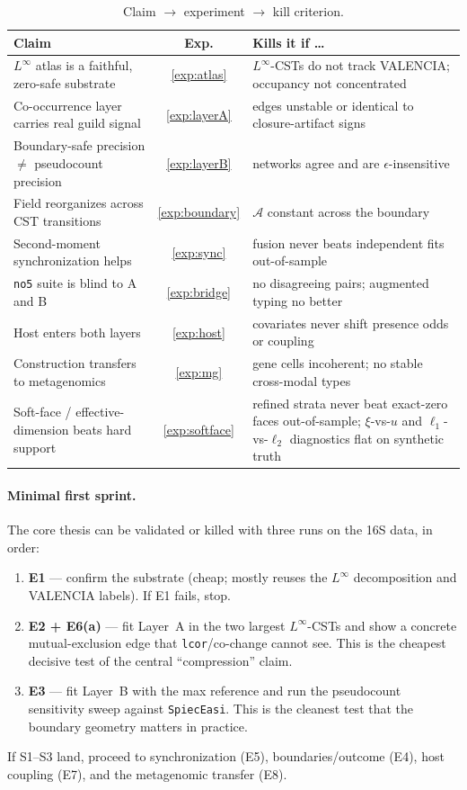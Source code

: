 \documentclass[11pt]{article}
\theoremstyle{definition}
\theoremstyle{plain}
\theoremstyle{remark}
\newcommand{\Linf}{L^{\infty}}
\newcommand{\1}{\mathbf{1}}
\newcommand{\Field}{\mathcal{A}}
\begin{document}
\begin{table}[h]\centering\small
\caption{Claim $\to$ experiment $\to$ kill criterion.}
\label{tab:falsify}
\begin{tabular}{@{}p{5.4cm} c p{6.0cm}@{}}
\toprule
Claim & Exp. & Kills it if \dots \\
\midrule
$\Linf$ atlas is a faithful, zero-safe substrate & \ref{exp:atlas} &
  $\Linf$-CSTs do not track VALENCIA; occupancy not concentrated \\
Co-occurrence layer carries real guild signal & \ref{exp:layerA} &
  edges unstable or identical to closure-artifact signs \\
Boundary-safe precision $\neq$ pseudocount precision & \ref{exp:layerB} &
  networks agree and are $\epsilon$-insensitive \\
Field reorganizes across CST transitions & \ref{exp:boundary} &
  $\Field$ constant across the boundary \\
Second-moment synchronization helps & \ref{exp:sync} &
  fusion never beats independent fits out-of-sample \\
\texttt{no5} suite is blind to A and B & \ref{exp:bridge} &
  no disagreeing pairs; augmented typing no better \\
Host enters both layers & \ref{exp:host} &
  covariates never shift presence odds or coupling \\
Construction transfers to metagenomics & \ref{exp:mg} &
  gene cells incoherent; no stable cross-modal types \\
Soft-face / effective-dimension beats hard support & \ref{exp:softface} &
  refined strata never beat exact-zero faces out-of-sample; $\xi$-vs-$u$ and
  $\ell_1$-vs-$\ell_2$ diagnostics flat on synthetic truth \\
\bottomrule
\end{tabular}
\end{table}

\paragraph{Minimal first sprint.} The core thesis can be validated or killed with
three runs on the 16S data, in order:
\begin{enumerate}[label=\textbf{S\arabic*.}]
\item \textbf{E1} --- confirm the substrate (cheap; mostly reuses the $\Linf$
  decomposition and VALENCIA labels). If E1 fails, stop.
\item \textbf{E2 + E6(a)} --- fit Layer~A in the two largest $\Linf$-CSTs and show
  a concrete mutual-exclusion edge that \texttt{lcor}/co-change cannot see. This is
  the cheapest decisive test of the central ``compression'' claim.
\item \textbf{E3} --- fit Layer~B with the max reference and run the pseudocount
  sensitivity sweep against \texttt{SpiecEasi}. This is the cleanest test that the
  boundary geometry matters in practice.
\end{enumerate}
If S1--S3 land, proceed to synchronization (E5), boundaries/outcome (E4), host
coupling (E7), and the metagenomic transfer (E8).
\end{document}
